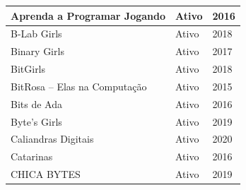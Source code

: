 \begin{longtable}{|l|l|l|}
Aprenda a Programar Jogando                                                                                                                                 & Ativo                        & 2016                        \\ \hline
  
B-Lab Girls                                                                                                                                                 & Ativo                        & 2018                        \\ \hline
Binary Girls                                                                                                                                                & Ativo                        & 2017                        \\ \hline
  
BitGirls                                                                                                                                                    & Ativo                        & 2018                        \\ \hline
  
BitRosa – Elas na Computação                                                                                                                                & Ativo                        & 2015                        \\ \hline
Bits de Ada                                                                                                                                                 & Ativo                        & 2016                        \\ \hline
  
Byte’s Girls                                                                                                                                                & Ativo                        & 2019                        \\ \hline
  
Caliandras Digitais                                                                                                                                         & Ativo                        & 2020                        \\ \hline
  
Catarinas                                                                                                                                                   & Ativo                        & 2016                        \\ \hline
CHICA BYTES                                                                                                                                                 & Ativo                        & 2019                        \\ \hline
  

\end{longtable}
